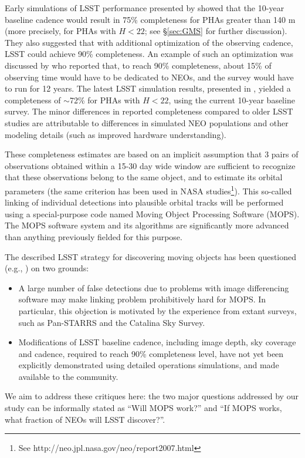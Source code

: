 Early simulations of LSST performance presented by \cite{IvezicNEO2007} showed that the 10-year baseline 
cadence would result in 75\% completeness for PHAs greater than 140 m (more  precisely, for PHAs with 
$H<22$; see \S\ref{sec:GMS} for further discussion). They also suggested that with additional optimization of the 
observing cadence, LSST could achieve 90\% completeness. An example of such an optimization was discussed
by \cite{LSSToverview} who reported that, to reach 90\% completeness, about 15\% of observing time would 
have to be dedicated to NEOs, and the survey would have to run for 12 years.  
The latest LSST simulation results, presented in \cite{JJI2016}, yielded a completeness of $\sim$72\% for
PHAs with $H<22$, using the current 10-year baseline survey. The minor differences in reported completeness
compared to older LSST studies are attributable to differences in simulated NEO populations and other modeling 
details (such as improved hardware understanding). 

These completeness estimates are based on an implicit assumption that 3 pairs of observations
obtained within a 15-30 day wide window are sufficient to recognize that these observations belong 
to the same object, and to estimate its orbital parameters (the same criterion has been used in NASA 
studies\footnote{See http://neo.jpl.nasa.gov/neo/report2007.html}). 
This so-called linking of individual detections into plausible orbital tracks will be performed using a 
special-purpose code named Moving Object Processing Software (MOPS). The MOPS software system and its 
algorithms are significantly more advanced than anything previously fielded for this purpose. 

The described LSST strategy for discovering moving objects has been questioned (e.g., \citealt{GMS2016}) on 
two grounds:
\begin{itemize}
\item A large number of false detections due to problems with image differencing software may 
make linking problem prohibitively hard for MOPS. In particular, this objection is motivated by the experience
from extant surveys, such as Pan-STARRS and the Catalina Sky Survey. 
\item Modifications of LSST baseline cadence, including image depth, sky coverage and cadence,
required to reach 90\% completeness level, have not yet been explicitly demonstrated using detailed
operations simulations, and made available to the community. 
\end{itemize} 
We aim to address these critiques here: the two major questions addressed by our study can be informally 
stated as ``Will MOPS work?'' and ``If MOPS works, what fraction of  NEOs will LSST discover?''. 

